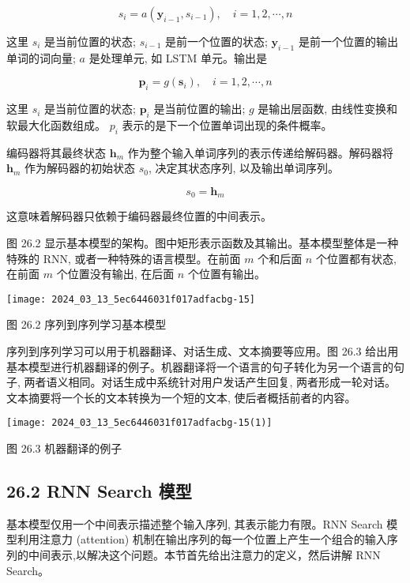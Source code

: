 \documentclass[10pt]{article}
\begin{document}
\begin{equation*}
s_{i}=a\left(\boldsymbol{y}_{i-1}, s_{i-1}\right), \quad i=1,2, \cdots, n \tag{26.5}
\end{equation*}


这里 $s_{i}$ 是当前位置的状态; $s_{i-1}$ 是前一个位置的状态; $\boldsymbol{y}_{i-1}$ 是前一个位置的输出单词的词向量; $a$ 是处理单元, 如 LSTM 单元。输出是


\begin{equation*}
\boldsymbol{p}_{i}=g\left(\boldsymbol{s}_{i}\right), \quad i=1,2, \cdots, n \tag{26.6}
\end{equation*}


这里 $s_{i}$ 是当前位置的状态; $\boldsymbol{p}_{i}$ 是当前位置的输出; $g$ 是输出层函数, 由线性变换和软最大化函数组成。 $p_{i}$ 表示的是下一个位置单词出现的条件概率。

编码器将其最终状态 $\boldsymbol{h}_{m}$ 作为整个输入单词序列的表示传递给解码器。解码器将 $\boldsymbol{h}_{m}$ 作为解码器的初始状态 $s_{0}$, 决定其状态序列, 以及输出单词序列。


\begin{equation*}
s_{0}=\boldsymbol{h}_{m} \tag{26.7}
\end{equation*}


这意味着解码器只依赖于编码器最终位置的中间表示。

图 26.2 显示基本模型的架构。图中矩形表示函数及其输出。基本模型整体是一种特殊的 RNN, 或者一种特殊的语言模型。在前面 $m$ 个和后面 $n$ 个位置都有状态, 在前面 $m$ 个位置没有输出, 在后面 $n$ 个位置有输出。

\begin{center}
\texttt{[image: 2024\_03\_13\_5ec6446031f017adfacbg-15]}
\end{center}

图 26.2 序列到序列学习基本模型

序列到序列学习可以用于机器翻译、对话生成、文本摘要等应用。图 26.3 给出用基本模型进行机器翻译的例子。机器翻译将一个语言的句子转化为另一个语言的句子, 两者语义相同。对话生成中系统针对用户发话产生回复, 两者形成一轮对话。文本摘要将一个长的文本转换为一个短的文本, 使后者概括前者的内容。

\begin{center}
\texttt{[image: 2024\_03\_13\_5ec6446031f017adfacbg-15(1)]}
\end{center}

图 26.3 机器翻译的例子

\subsection*{26.2 RNN Search 模型}
基本模型仅用一个中间表示描述整个输入序列, 其表示能力有限。RNN Search 模型利用注意力 (attention) 机制在输出序列的每一个位置上产生一个组合的输入序列的中间表示,以解决这个问题。本节首先给出注意力的定义，然后讲解 RNN Search。
\end{document}

